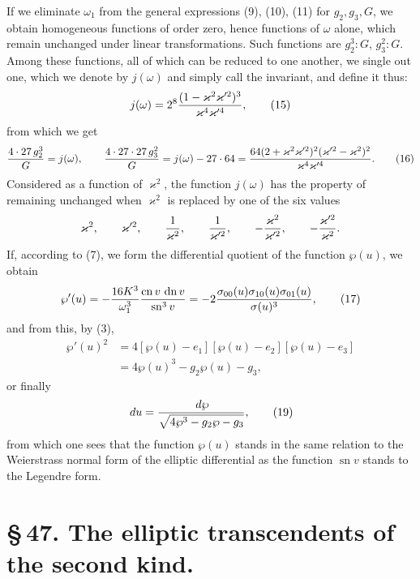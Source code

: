 \documentclass[11pt]{article}
\providecommand{\dd}{\,d}
\providecommand{\sn}{\operatorname{sn}}
\providecommand{\cn}{\operatorname{cn}}
\providecommand{\dn}{\operatorname{dn}}
\begin{document}
If we eliminate $\omega_1$ from the general expressions (9), (10), (11) for $g_2,g_3,G$, we obtain homogeneous functions of order zero, hence functions of $\omega$ alone, which remain unchanged under linear transformations. Such functions are $g_2^3:G$, $g_3^2:G$. Among these functions, all of which can be reduced to one another, we single out one, which we denote by $j(\omega)$ and simply call the invariant, and define it thus:
\begin{equation}
 j(\omega)=2^8{(1-\varkappa^2\varkappa'^2)^3\over\varkappa^4\varkappa'^4},
\tag{15}
\end{equation}
from which we get
\begin{equation}
 {4\cdot27\,g_2^3\over G}=j(\omega),
\qquad
 {4\cdot27\cdot27\,g_3^2\over G}=j(\omega)-27\cdot64
 ={64(2+\varkappa^2\varkappa'^2)^2(\varkappa'^2-\varkappa^2)^2\over\varkappa^4\varkappa'^4}.
\tag{16}
\end{equation}
Considered as a function of $\varkappa^2$, the function $j(\omega)$ has the property of remaining unchanged when $\varkappa^2$ is replaced by one of the six values
\[
\varkappa^2,
\qquad \varkappa'^2,
\qquad {1\over\varkappa^2},
\qquad {1\over\varkappa'^2},
\qquad -{\varkappa^2\over\varkappa'^2},
\qquad -{\varkappa'^2\over\varkappa^2}.
\]
If, according to (7), we form the differential quotient of the function $\wp(u)$, we obtain
\begin{equation}
\wp'(u)=-{16K^3\over\omega_1^3}{\cn v\,\dn v\over\sn^3v}
=-2{\sigma_{00}(u)\sigma_{10}(u)\sigma_{01}(u)\over\sigma(u)^3},
\tag{17}
\end{equation}
and from this, by (3),
\begin{equation}
\begin{aligned}
\wp'(u)^2&=4[\wp(u)-e_1][\wp(u)-e_2][\wp(u)-e_3]\\
&=4\wp(u)^3-g_2\wp(u)-g_3,
\end{aligned}
\tag{18}
\end{equation}
or finally
\begin{equation}
\dd u={\dd\wp\over\sqrt{4\wp^3-g_2\wp-g_3}},
\tag{19}
\end{equation}
from which one sees that the function $\wp(u)$ stands in the same relation to the Weierstrass normal form of the elliptic differential as the function $\sn v$ stands to the Legendre form.

\section*{\S\,47. The elliptic transcendents of the second kind.}
\end{document}
